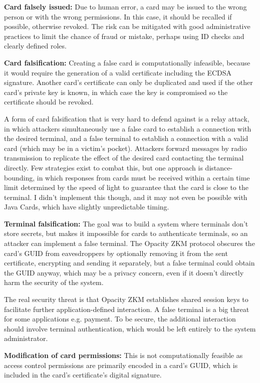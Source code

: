 \documentclass[12pt,a4paper]{article}
\begin{document}
\textbf{Card falsely issued:} Due to human error, a card may be issued to the wrong person or with the wrong permissions. In this case, it should be recalled if possible, otherwise revoked. The risk can be mitigated with good administrative practices to limit the chance of fraud or mistake, perhaps using ID checks and clearly defined roles.

\textbf{Card falsification:} Creating a false card is computationally infeasible, because it would require the generation of a valid certificate including the ECDSA signature. Another card's certificate can only be duplicated and used if the other card's private key is known, in which case the key is compromised so the certificate should be revoked.

A form of card falsification that is very hard to defend against is a relay attack, in which attackers simultaneously use a false card to establish a connection with the desired terminal, and a false terminal to establish a connection with a valid card (which may be in a victim's pocket). Attackers forward messages by radio transmission to replicate the effect of the desired card contacting the terminal directly. Few strategies exist to combat this, but one approach is distance-bounding, in which responses from cards must be received within a certain time limit determined by the speed of light to guarantee that the card is close to the terminal. I didn't implement this though, and it may not even be possible with Java Cards, which have slightly unpredictable timing.

\textbf{Terminal falsification:} The goal was to build a system where terminals don't store secrets, but makes it impossible for cards to authenticate terminals, so an attacker can implement a false terminal. The Opacity ZKM protocol obscures the card's GUID from eavesdroppers by optionally removing it from the sent certificate, encrypting and sending it separately, but a false terminal could obtain the GUID anyway, which may be a privacy concern, even if it doesn't directly harm the security of the system.

The real security threat is that Opacity ZKM establishes shared session keys to facilitate further application-defined interaction. A false terminal is a big threat for some applications e.g. payment. To be secure, the additional interaction should involve terminal authentication, which would be left entirely to the system administrator.

\textbf{Modification of card permissions:} This is not computationally feasible as access control permissions are primarily encoded in a card's GUID, which is included in the card's certificate's digital signature.
\end{document}
